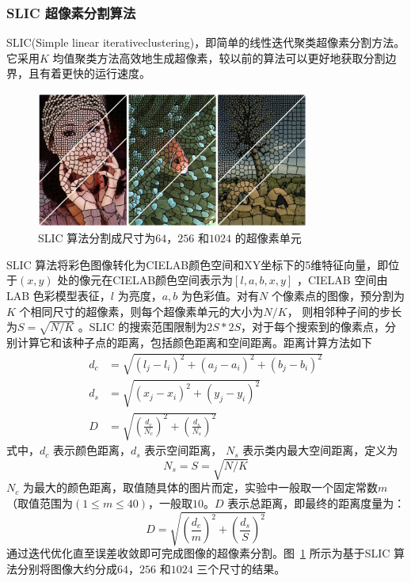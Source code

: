 \subsubsection{SLIC 超像素分割算法}
\label{subsubsec:chap02-1-1-1}
SLIC(Simple linear iterativeclustering)，即简单的线性迭代聚类超像素分割方法。它采用$K$ 均值聚类方法高效地生成超像素，较以前的算法可以更好地获取分割边界，且有着更快的运行速度。

\begin{figure}[htb]
  \centering
  \includegraphics[width=0.8\textwidth]{figures/slic}
  \caption{SLIC 算法分割成尺寸为$64$，$256$ 和$1024$ 的超像素单元}\label{fig:slic}
\end{figure}

SLIC 算法将彩色图像转化为CIELAB颜色空间和XY坐标下的5维特征向量，即位于$(x,y)$ 处的像元在CIELAB颜色空间表示为$[l,a,b,x,y]$ ，CIELAB 空间由LAB 色彩模型表征，$l$ 为亮度，$a,b$ 为色彩值。对有$N$ 个像素点的图像，预分割为$K$ 个相同尺寸的超像素，则每个超像素单元的大小为$N/ K$， 则相邻种子间的步长为$S = \sqrt{N/K}$ 。SLIC 的搜索范围限制为$2S*2S$，对于每个搜索到的像素点，分别计算它和该种子点的距离，包括颜色距离和空间距离。距离计算方法如下
\begin{equation}
  \label{eq:2-5}
  \begin{split}
    d_c &= \sqrt{(l_j-l_i)^2 + (a_j-a_i)^2 + (b_j - b_i)^2} \\
    d_s &= \sqrt{(x_j-x_i)^2 + (y_j-y_i)^2} \\
    D &= \sqrt{(\frac{d_c}{N_c})^2 + (\frac{d_s}{N_s})^2}
  \end{split}
\end{equation}
式中，$d_c$ 表示颜色距离，$d_s$ 表示空间距离， $N_s$ 表示类内最大空间距离，定义为
\begin{equation}
  \label{eq:2-6}
  N_s = S = \sqrt{N/K}
\end{equation}
$N_c$ 为最大的颜色距离，取值随具体的图片而定，实验中一般取一个固定常数$m$ （取值范围为$(1\leq m \leq 40)$，一般取$10$。$D$ 表示总距离，即最终的距离度量为：
\begin{equation}
  \label{eq:2-7}
  D = \sqrt{(\frac{d_c}{m})^2 + (\frac{d_s}{S})^2}
\end{equation}
通过迭代优化直至误差收敛即可完成图像的超像素分割。图~\ref{fig:slic} 所示为基于SLIC 算法分别将图像大约分成$64$，$256$ 和$1024$ 三个尺寸的结果。



